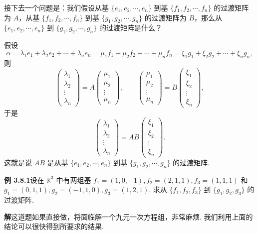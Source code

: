 \documentclass[UTF8, 12pt, fontset=fandol, oneside]{ctexart}
\begin{document}
接下去一个问题是：我们假设从基 $\{e_1,e_2,\cdots,e_n\}$ 到基 $\{f_1,f_2,\cdots,f_n\}$ 的过渡矩阵为 $A$，从基 $\{f_1,f_2,\cdots,f_n\}$ 到基 $\{g_1,g_2,\cdots,g_n\}$ 的过渡矩阵为 $B$，那么从 $\{e_1,e_2,\cdots,e_n\}$ 到 $\{g_1,g_2,\cdots,g_n\}$ 的过渡矩阵是什么？

假设
\[
\alpha=\lambda_1e_1+\lambda_2e_2+\cdots+\lambda_ne_n
=\mu_1f_1+\mu_2f_2+\cdots+\mu_nf_n
=\xi_1g_1+\xi_2g_2+\cdots+\xi_ng_n,
\]
则
\[
\left(\begin{array}{c}
\lambda_1\\
\lambda_2\\
\vdots\\
\lambda_n
\end{array}\right)
=A
\left(\begin{array}{c}
\mu_1\\
\mu_2\\
\vdots\\
\mu_n
\end{array}\right),\qquad
\left(\begin{array}{c}
\mu_1\\
\mu_2\\
\vdots\\
\mu_n
\end{array}\right)
=B
\left(\begin{array}{c}
\xi_1\\
\xi_2\\
\vdots\\
\xi_n
\end{array}\right),
\]
于是
\[
\left(\begin{array}{c}
\lambda_1\\
\lambda_2\\
\vdots\\
\lambda_n
\end{array}\right)
=AB
\left(\begin{array}{c}
\xi_1\\
\xi_2\\
\vdots\\
\xi_n
\end{array}\right).
\]
这就是说 $AB$ 是从基 $\{e_1,e_2,\cdots,e_n\}$ 到基 $\{g_1,g_2,\cdots,g_n\}$ 的过渡矩阵.

\noindent\textbf{例 3.8.1}\quad 设在 $\mathbb{K}^3$ 中有两组基 $f_1=(1,0,-1),f_2=(2,1,1),f_3=(1,1,1)$ 和 $g_1=(0,1,1),g_2=(-1,1,0),g_3=(1,2,1)$. 求从 $\{f_1,f_2,f_3\}$ 到 $\{g_1,g_2,g_3\}$ 的过渡矩阵.

\noindent\textbf{解}\quad 这道题如果直接做，将面临解一个九元一次方程组，非常麻烦. 我们利用上面的结论可以很快得到所要求的结果.
\end{document}
